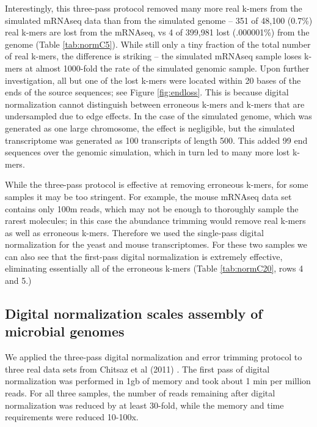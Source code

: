 Interestingly, this three-pass protocol removed many more real k-mers
from the simulated mRNAseq data than from the simulated genome -- 351
of 48,100 (0.7\%) real k-mers are lost from the mRNAseq, vs 4 of
399,981 lost (.000001\%) from the genome (Table \ref{tab:normC5}).
While still only a tiny fraction of the total number of real k-mers,
the difference is striking -- the simulated mRNAseq sample loses k-mers
at almost 1000-fold the rate of the simulated genomic sample.  Upon
further investigation, all but one of the lost k-mers were located
within 20 bases of the ends of the source sequences; see Figure
\ref{fig:endloss}.  This is because digital normalization cannot
distinguish between erroneous k-mers and k-mers that are undersampled
due to edge effects.  In the case of the simulated genome, which was
generated as one large chromosome, the effect is negligible, but the
simulated transcriptome was generated as 100 transcripts of length
500.  This added 99 end sequences over the genomic simulation, which
in turn led to many more lost k-mers.

While the three-pass protocol is effective at removing erroneous
k-mers, for some samples it may be too stringent.  For example, the
mouse mRNAseq data set contains only 100m reads, which may not be
enough to thoroughly sample the rarest molecules; in this case the
abundance trimming would remove real k-mers as well as erroneous k-mers.
Therefore we used the single-pass digital normalization
for the yeast and mouse transcriptomes.  For these two samples we can
also see that the first-pass digital normalization is extremely effective,
eliminating essentially all of the erroneous k-mers (Table \ref{tab:normC20},
rows 4 and 5.)

\subsection{Digital normalization scales assembly of microbial genomes}

We applied the three-pass digital normalization and error trimming
protocol to three real data sets from Chitsaz et al (2011)
\cite{pubmed21926975}.  The first pass of digital normalization was
performed in 1gb of memory and took about 1 min per million reads.
For all three samples, the number of reads remaining after digital
normalization was reduced by at least 30-fold, while the memory and
time requirements were reduced 10-100x.


